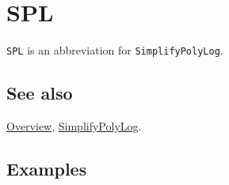 \documentclass[../FeynCalcManual.tex]{subfiles}
\begin{document}
\hypertarget{spl}{%
\section{SPL}\label{spl}}

\texttt{SPL} is an abbreviation for \texttt{SimplifyPolyLog}.

\subsection{See also}

\hyperlink{toc}{Overview}, \hyperlink{simplifypolylog}{SimplifyPolyLog}.

\subsection{Examples}
\end{document}
